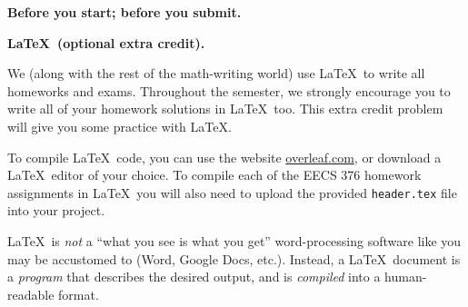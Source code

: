 \documentclass[11pt,addpoints,answers]{exam}
\begin{document}
\hwpreface

\begin{questions}

  \addtocounter{question}{-1}
  \question[0] \textbf{Before you start; before you submit.}
  

  \bonusquestion \textbf{\LaTeX\ (optional extra credit).} 

We (along with the rest of the math-writing world) use \LaTeX\ to write all homeworks and exams. Throughout the semester, we strongly encourage you to write all of your homework solutions in \LaTeX\ too. This extra credit problem will give you some practice with \LaTeX.

To compile \LaTeX\ code, you can use the website \url{overleaf.com}, or download a \LaTeX\ editor of your choice. To compile each of the EECS 376 homework assignments in \LaTeX\ you will also need to upload the provided \texttt{header.tex} file into your project.

\LaTeX\ is \emph{not} a ``what you see is what you get'' word-processing software like you may be accustomed to (Word, Google Docs, etc.).
Instead, a \LaTeX\ document is a \emph{program} that describes the desired output, and is \emph{compiled} into a human-readable format.




\end{questions}
\end{document}
